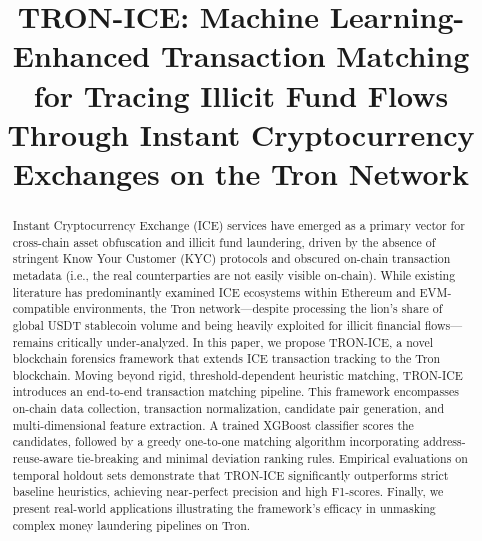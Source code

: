 \documentclass[journal]{IEEEtran}
\begin{document}
    
    \title{TRON-ICE: Machine Learning-Enhanced Transaction Matching for Tracing Illicit Fund Flows Through Instant Cryptocurrency Exchanges on the Tron Network}
    
    \author{
        \and
    }
    
    \maketitle
    \begin{abstract}
    Instant Cryptocurrency Exchange (ICE) services have emerged as a primary vector for cross-chain asset obfuscation and illicit fund laundering, driven by the absence of stringent Know Your Customer (KYC) protocols and obscured on-chain transaction metadata (i.e., the real counterparties are not easily visible on-chain). While existing literature has predominantly examined ICE ecosystems within Ethereum and EVM-compatible environments, the Tron network—despite processing the lion's share of global USDT stablecoin volume and being heavily exploited for illicit financial flows—remains critically under-analyzed. In this paper, we propose \textsf{TRON-ICE}, a novel blockchain forensics framework that extends ICE transaction tracking to the Tron blockchain. Moving beyond rigid, threshold-dependent heuristic matching, \textsf{TRON-ICE} introduces an end-to-end transaction matching pipeline. This framework encompasses on-chain data collection, transaction normalization, candidate pair generation, and multi-dimensional feature extraction. A trained XGBoost classifier scores the candidates, followed by a greedy one-to-one matching algorithm incorporating address-reuse-aware tie-breaking and minimal deviation ranking rules. Empirical evaluations on temporal holdout sets demonstrate that \textsf{TRON-ICE} significantly outperforms strict baseline heuristics, achieving near-perfect precision and high F1-scores. Finally, we present real-world applications illustrating the framework's efficacy in unmasking complex money laundering pipelines on Tron.
    \end{abstract}
    
\end{document}
